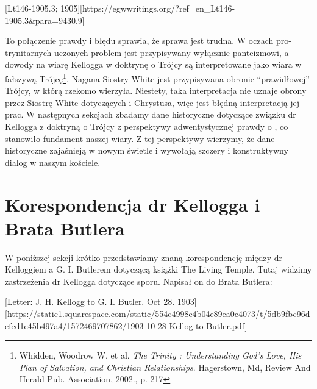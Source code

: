 [Lt146-1905.3; 1905][https://egwwritings.org/?ref=en\_Lt146-1905.3&para=9430.9]

To połączenie prawdy i błędu sprawia, że sprawa jest trudna. W oczach pro-trynitarnych uczonych problem jest przypisywany wyłącznie panteizmowi, a dowody na wiarę Kellogga w doktrynę o Trójcy są interpretowane jako wiara w fałszywą Trójcę\footnote{Whidden, Woodrow W, et al. \textit{The Trinity : Understanding God's Love, His Plan of Salvation, and Christian Relationships}. Hagerstown, Md, Review And Herald Pub. Association, 2002., p. 217}. Nagana Siostry White jest przypisywana obronie “prawidłowej” Trójcy, w którą rzekomo wierzyła. Niestety, taka interpretacja nie uznaje obrony przez Siostrę White  dotyczących  i Chrystusa, więc jest błędną interpretacją jej prac. W następnych sekcjach zbadamy dane historyczne dotyczące związku dr Kellogga z doktryną o Trójcy z perspektywy adwentystycznej prawdy o , co stanowiło fundament naszej wiary. Z tej perspektywy wierzymy, że dane historyczne zajaśnieją w nowym świetle i wywołają szczery i konstruktywny dialog w naszym kościele.

\section*{Korespondencja dr Kellogga i Brata Butlera}

W poniższej sekcji krótko przedstawiamy znaną korespondencję między dr Kelloggiem a G. I. Butlerem dotyczącą książki The Living Temple. Tutaj widzimy zastrzeżenia dr Kellogga dotyczące sporu. Napisał on do Brata Butlera:

[Letter: J. H. Kellogg to G. I. Butler. Oct 28. 1903][https://static1.squarespace.com/static/554c4998e4b04e89ea0c4073/t/5db9fbc96defed1e45b497a4/1572469707862/1903-10-28-Kellog-to-Butler.pdf]


